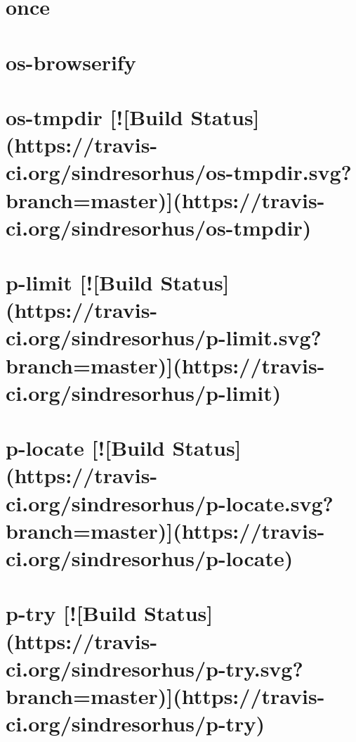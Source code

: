 \documentclass[twoside]{book}
\newcommand{\+}{\discretionary{\mbox{\scriptsize$\hookleftarrow$}}{}{}}
\begin{document}
\chapter{once}
\label{md_dsmacc_examples_DRmerge_node_modules_once_README}

\chapter{os-\/browserify}
\label{md_dsmacc_examples_DRmerge_node_modules_os-browserify_README}

\chapter{os-\/tmpdir \mbox{[}!\mbox{[}Build Status\mbox{]}(https\+://travis-\/ci.org/sindresorhus/os-\/tmpdir.svg?branch=master)\mbox{]}(https\+://travis-\/ci.org/sindresorhus/os-\/tmpdir)}
\label{md_dsmacc_examples_DRmerge_node_modules_os-tmpdir_readme}

\chapter{p-\/limit \mbox{[}!\mbox{[}Build Status\mbox{]}(https\+://travis-\/ci.org/sindresorhus/p-\/limit.svg?branch=master)\mbox{]}(https\+://travis-\/ci.org/sindresorhus/p-\/limit)}
\label{md_dsmacc_examples_DRmerge_node_modules_p-limit_readme}

\chapter{p-\/locate \mbox{[}!\mbox{[}Build Status\mbox{]}(https\+://travis-\/ci.org/sindresorhus/p-\/locate.svg?branch=master)\mbox{]}(https\+://travis-\/ci.org/sindresorhus/p-\/locate)}
\label{md_dsmacc_examples_DRmerge_node_modules_p-locate_readme}

\chapter{p-\/try \mbox{[}!\mbox{[}Build Status\mbox{]}(https\+://travis-\/ci.org/sindresorhus/p-\/try.svg?branch=master)\mbox{]}(https\+://travis-\/ci.org/sindresorhus/p-\/try)}
\label{md_dsmacc_examples_DRmerge_node_modules_p-try_readme}

\end{document}
